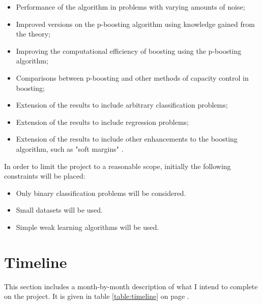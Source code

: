 \begin{itemize}
\item	Performance of the algorithm in problems with varying amounts
	of noise;

\item	Improved versions on the p-boosting algorithm using knowledge
	gained from the theory;

\item	Improving the computational efficiency of boosting using the
	p-boosting algorithm;

\item	Comparisons between p-boosting and other methods of capacity
	control in boosting;

\item	Extension of the results to include arbitrary classification
	problems;

\item	Extension of the results to include regression problems;

\item	Extension of the results to include other enhancements to the
	boosting algorithm, such as "soft margins" \cite{Ratsch98}.
\end{itemize}

In order to limit the project to a reasonable scope, initially the following constraints will be placed:

\begin{itemize}
\item	Only binary classification problems will be considered.

\item	Small datasets will be used.

\item	Simple weak learning algorithms will be used.
\end{itemize}


\section{Timeline}
This section includes a month-by-month description of what I intend to
complete on the project.  It is given in table \ref{table:timeline} on
page \pageref{table:timeline}.

